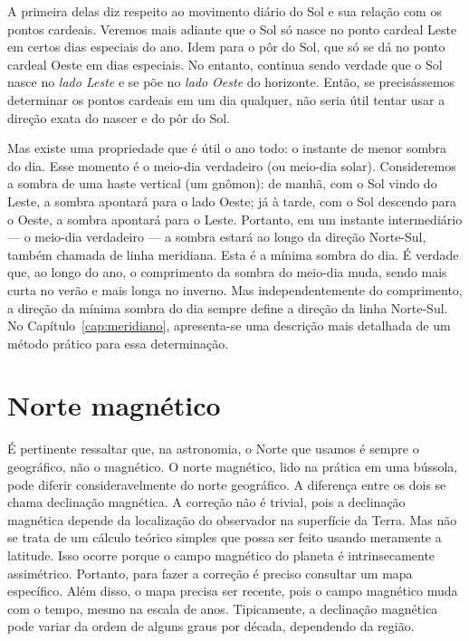 A primeira delas diz respeito ao movimento diário do Sol e sua relação com os pontos cardeais. Veremos mais adiante que o Sol só nasce no ponto cardeal Leste em certos dias especiais do ano. Idem para o pôr do Sol, que só se dá no ponto cardeal Oeste em dias especiais. No entanto, continua sendo verdade que o Sol nasce no \textit{lado Leste} e se põe no \textit{lado Oeste} do horizonte. Então, se precisássemos determinar os pontos cardeais em um dia qualquer, não seria útil tentar usar a direção exata do nascer e do pôr do Sol.

Mas existe uma propriedade que é útil o ano todo: o instante de menor sombra do dia. Esse momento é o meio-dia verdadeiro (ou meio-dia solar). Consideremos a sombra de uma haste vertical (um gnômon): de manhã, com o Sol vindo do Leste, a sombra apontará para o lado Oeste; já à tarde, com o Sol descendo para o Oeste, a sombra apontará para o Leste. Portanto, em um instante intermediário --- o meio-dia verdadeiro --- a sombra estará ao longo da direção Norte-Sul, também chamada de linha meridiana. Esta é a mínima sombra do dia. É verdade que, ao longo do ano, o comprimento da sombra do meio-dia muda, sendo mais curta no verão e mais longa no inverno. Mas independentemente do comprimento, a direção da mínima sombra do dia sempre define a direção da linha Norte-Sul. No Capítulo~\ref{cap:meridiano}, apresenta-se uma descrição mais detalhada de um método prático para essa determinação.

\section{Norte magnético}

É pertinente ressaltar que, na astronomia, o Norte que usamos é sempre o geográfico, não o magnético. O norte magnético, lido na prática em uma bússola, pode diferir consideravelmente do norte geográfico. A diferença entre os dois se chama declinação magnética. A correção não é trivial, pois a declinação magnética depende da localização do observador na superfície da Terra. Mas não se trata de um cálculo teórico simples que possa ser feito usando meramente a latitude. Isso ocorre porque o campo magnético do planeta é intrinsecamente assimétrico. Portanto, para fazer a correção é preciso consultar um mapa específico. Além disso, o mapa precisa ser recente, pois o campo magnético muda com o tempo, mesmo na escala de anos. Tipicamente, a declinação magnética pode variar da ordem de alguns graus por década, dependendo da região.

